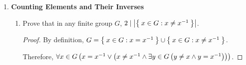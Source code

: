 \begin{enumerate}[label={\Alph*.},font={\bfseries}]
\begin{enumerate}[label={\arabic*},font={\bfseries}]
\begin{align*}
      abc &= (abc)^{-1} \\
      bca &= a^{-1}(abc)^{-1}a \\
      &= a^{-1}(bc)^{-1} \\
      &= (bca)^{-1} \\
      \\
      bca &= (bca)^{-1} \\
      cab &= b^{-1}(bca)^{-1}b \\
      &= b^{-1}(ca)^{-1} \\
      &= (cab)^{-1}
    \end{align*}
  \item Let $a = a^{-1}$ and $b = b^{-1}$, show that $(ab)^{-1} = ba$.
    \begin{proof}
      Replace $a$ and $b$ with their inverses on the right-hand side of
      $(ab)^{-1} = b^{-1}a^{-1}$ to obtain $(ab)^{-1} = ba$.
    \end{proof}
  \item $a = a^{-1} \iff a^2 = e$
    \begin{proof}
      If $a = a^{-1}$, then $a^2 = e$ by multiplying by $a$ on the right.
      If $a^2 = e$, then $a = a^{-1}$ by multiplying by $a^{-1}$ on the right.
    \end{proof}
  \item Let $c = c^{-1}$. Prove $ab = c \iff abc = e$.
    \begin{proof}
      If $ab = c$, then $ab = c^{-1}$, since $c = c^{-1}$.
      Multiply by $c$ on the right to obtain $abc = e$.
      If $abc = e$, then $abc^{-1} = e$ since $c = c^{-1}$.
      Multiply by $c$ on the right to obtain $ab = c$.
    \end{proof}
  \end{enumerate}
\item {\bf Counting Elements and Their Inverses}
  \begin{enumerate}[label={\arabic*},font={\bfseries}]
  \item Prove that in any finite group $G$, $2 \mid \left|\Set{x \in G : x \ne x^{-1}}\right|$.
    \begin{proof}
      By definition, $G = \Set{x \in G : x = x^{-1}} \cup \Set{x \in G : x \ne x^{-1}}$.

      Therefore, $\forall x \in G\left(x = x^{-1} \lor \left(x \ne x^{-1} \land \exists y \in G\left(y \ne x \land y = x^{-1}\right)\right)\right)$.


\end{proof}
\end{enumerate}
\end{enumerate}
